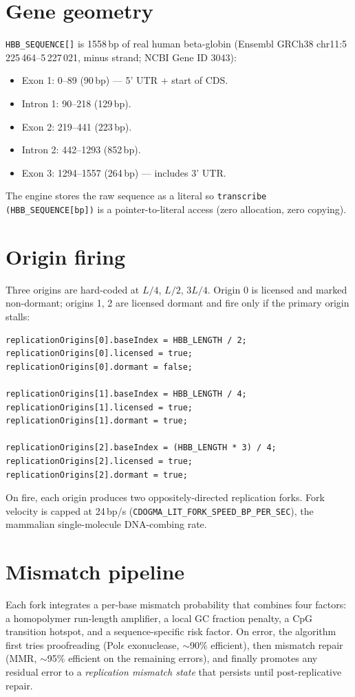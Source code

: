 \documentclass[11pt,letterpaper,twoside,openany]{book}
\newcommand{\code}[1]{\texttt{#1}}
\begin{document}
\section{Gene geometry}

\code{HBB\_SEQUENCE[]} is 1558\,bp of real human beta-globin
(Ensembl GRCh38 chr11:5\,225\,464--5\,227\,021, minus strand;
NCBI Gene ID 3043):
\begin{itemize}
  \item Exon 1: 0--89 (90\,bp) --- 5' UTR + start of CDS.
  \item Intron 1: 90--218 (129\,bp).
  \item Exon 2: 219--441 (223\,bp).
  \item Intron 2: 442--1293 (852\,bp).
  \item Exon 3: 1294--1557 (264\,bp) --- includes 3' UTR.
\end{itemize}
The engine stores the raw sequence as a literal so \code{transcribe
(HBB\_SEQUENCE[bp])} is a pointer-to-literal access (zero allocation,
zero copying).

\section{Origin firing}

Three origins are hard-coded at $L/4$, $L/2$, $3L/4$. Origin 0 is
licensed and marked non-dormant; origins 1, 2 are licensed dormant
and fire only if the primary origin stalls:
\begin{lstlisting}
replicationOrigins[0].baseIndex = HBB_LENGTH / 2;
replicationOrigins[0].licensed = true;
replicationOrigins[0].dormant = false;

replicationOrigins[1].baseIndex = HBB_LENGTH / 4;
replicationOrigins[1].licensed = true;
replicationOrigins[1].dormant = true;

replicationOrigins[2].baseIndex = (HBB_LENGTH * 3) / 4;
replicationOrigins[2].licensed = true;
replicationOrigins[2].dormant = true;
\end{lstlisting}
On fire, each origin produces two oppositely-directed replication
forks. Fork velocity is capped at 24\,bp/s
(\code{CDOGMA\_LIT\_FORK\_SPEED\_BP\_PER\_SEC}), the mammalian
single-molecule DNA-combing rate.

\section{Mismatch pipeline}

Each fork integrates a per-base mismatch probability that combines
four factors: a homopolymer run-length amplifier, a local GC fraction
penalty, a CpG transition hotspot, and a sequence-specific risk
factor. On error, the algorithm first tries proofreading
(Pol\(\epsilon\) exonuclease, \(\sim\)90\% efficient), then mismatch
repair (MMR, \(\sim\)95\% efficient on the remaining errors), and
finally promotes any residual error to a \emph{replication
mismatch state} that persists until post-replicative repair.
\end{document}
